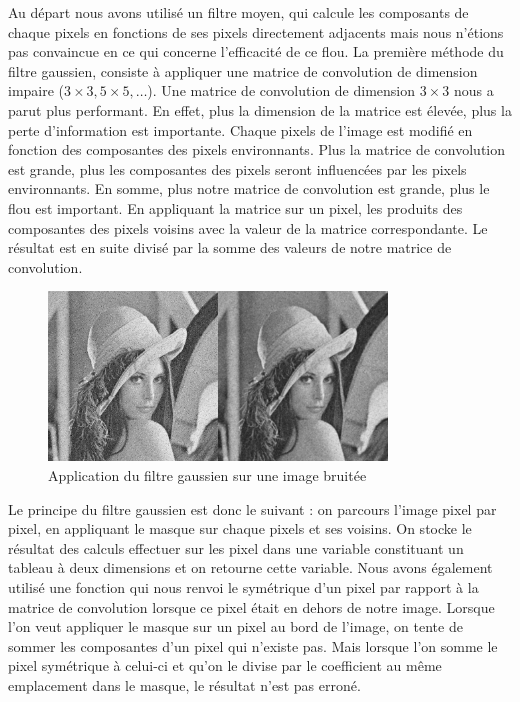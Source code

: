 \documentclass[11pt]{report}
\begin{document}
Au départ nous avons utilisé un filtre moyen, qui calcule les composants de chaque pixels en fonctions de ses pixels directement adjacents mais nous n'étions pas convaincue en ce qui concerne  l'efficacité de ce flou. La première méthode du filtre gaussien, consiste à appliquer une matrice de convolution de dimension impaire ($3 \times 3, 5 \times 5, …$). Une matrice de convolution de dimension $3 \times 3$ nous a parut plus performant. En effet, plus la dimension de la matrice est élevée, plus la perte d'information est importante. Chaque pixels de l'image est modifié en fonction des composantes des pixels environnants. Plus la matrice de convolution est grande, plus les composantes des  pixels seront influencées par les pixels environnants. En somme, plus notre matrice de convolution est grande, plus le flou est important. En appliquant la matrice sur un pixel, les produits des composantes des pixels voisins avec la valeur de la matrice correspondante. Le résultat est en suite divisé par la somme des valeurs de notre matrice de convolution. 

\begin{figure}[htbp]
\centering
\includegraphics[width=9cm]{filtre_gaussien.png}
\caption{Application du filtre gaussien sur une image bruitée}
\end{figure}

Le principe du filtre gaussien est donc le suivant : on parcours l'image pixel par pixel, en appliquant le masque sur chaque pixels et ses voisins. On stocke le résultat des calculs effectuer sur les pixel dans une variable constituant un tableau à deux dimensions et on retourne cette variable. Nous avons également utilisé une fonction qui nous renvoi le symétrique d'un pixel par rapport à la matrice de convolution lorsque ce pixel était en dehors de notre image. Lorsque l'on veut appliquer le masque sur un pixel au bord de l'image, on tente de sommer les composantes d'un pixel qui n'existe pas. Mais lorsque l'on somme le pixel symétrique à celui-ci et qu'on le divise par le coefficient au même emplacement dans le masque, le résultat n'est pas erroné.
\end{document}
